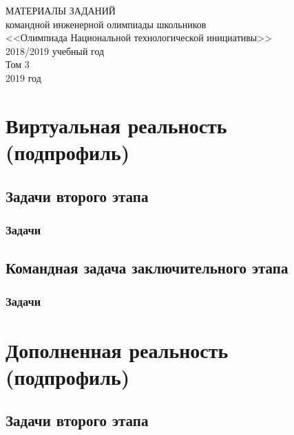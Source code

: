 \documentclass[a4paper,12pt,oneside]{book}
\begin{document}
\begin{titlepage}
    \begin{center}
        \huge{МАТЕРИАЛЫ ЗАДАНИЙ} \\
        \Large{командной инженерной олимпиады школьников} \\
        \Large{<<Олимпиада Национальной технологической инициативы>>} \\
        \large{2018/2019 учебный год} \\        
        \large{Том 3} \\
        \vspace{14cm}
        \Large{2019 год}  
    \end{center}
  \end{titlepage}
\setcounter{tocdepth}{1}
 
\tableofcontents

\part{Виртуальная реальность (подпрофиль)}
\clearpage
\chapter{Задачи второго этапа}
\section{Задачи}

\clearpage
\chapter{Командная задача заключительного этапа}
\section{Задачи}


\part{Дополненная реальность (подпрофиль)}
\clearpage
\chapter{Задачи второго этапа}


\clearpage
\end{document}
